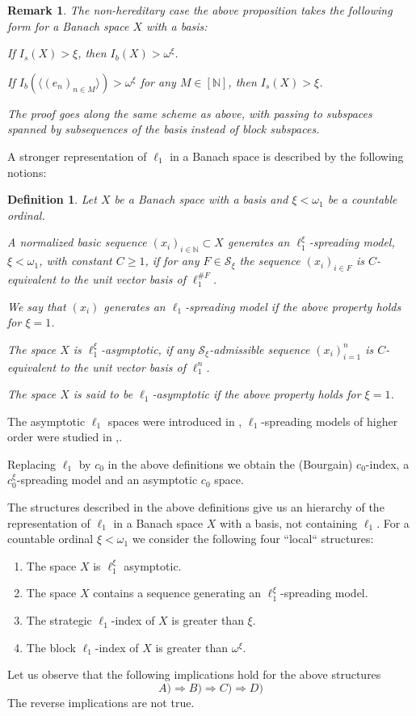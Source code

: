 \documentclass[a4paper]{amsart}
\theoremstyle{plain}
\newtheorem{definition}[theorem]{Definition}
\newtheorem{remark}[theorem]{Remark}
\newcommand{\N}{\mathbb{N}}
\newcommand{\mc}{\mathcal}
\begin{document}
\begin{remark} \label{asympt}
The non-hereditary case the above proposition takes the following form for a Banach space
$X$ with a basis:

If $I_s(X)> \xi$, then $I_b(X)>\omega^\xi$.

If $I_b(\langle (e_n)_{n\in M}\rangle)>\omega^\xi$ for any $M\in [\N]$, then $I_s(X)> \xi$.

The proof goes along the same scheme as above, with passing to subspaces spanned by
subsequences of the basis instead of block subspaces.
\end{remark}
A stronger representation of $\ell_{1}$ in a Banach space is
described by the following notions:
\begin{definition}
Let $X$ be a Banach space with a basis and  $\xi<\omega_{1}$ be a countable ordinal.

A normalized basic sequence $(x_i)_{i\in\N}\subset X$ \textit{generates an
$\ell_{1}^{\xi}$-spreading model}, $\xi<\omega_1$, with constant $C\geq 1$, if for any
$F\in  \mc{S}_\xi$ the sequence $(x_i)_{i\in F}$ is $C$-equivalent to the unit vector
basis of $\ell_{1}^{\# F}$.

We say that $(x_i)$ generates an $\ell_{1}$-spreading model if the above property holds for
$\xi=1$.

The space $X$ is $\ell_{1}^{\xi}$-\textit{asymptotic},
 if any $\mc{S}_{\xi}$-admissible sequence
$(x_i)_{i=1}^n$ is $C$-equivalent to the unit vector basis of $\ell_{1}^n$.

The space $X$  is said to be $\ell_{1}$-asymptotic if the above property holds for
$\xi=1$.
\end{definition}
The asymptotic $\ell_{1}$ spaces were introduced in \cite{MT}, $\ell_{1}$-spreading models of
higher order were studied in \cite{AMT},\cite{AG}.

Replacing $\ell_{1}$ by $c_0$ in the above definitions we obtain the (Bourgain) $c_0$-index,
a $c_0^\xi$-spreading model and an asymptotic $c_0$ space.



The structures described in the above definitions give us an hierarchy of the
representation of $\ell_{1}$ in a Banach space $X$ with a basis, not containing
$\ell_{1}$. For a countable ordinal $\xi<\omega_{1}$ we consider the following four
``local`` structures:
\begin{enumerate}
\item[A)] The space $X$ is  $\ell_{1}^{\xi}$ asymptotic. \item[B)]
The space $X$ contains a sequence generating an
$\ell_{1}^{\xi}$-spreading model.
 \item[C)] The strategic
$\ell_{1}$-index of $X$ is greater than $\xi$.
\item[D)] The block
$\ell_{1}$-index of $X$ is greater than $\omega^{\xi}$.
\end{enumerate}
Let us observe that the following implications hold for the above
structures
$$
A)\Rightarrow B)\Rightarrow C) \Rightarrow D)
$$
The reverse implications are not true.
\end{document}
